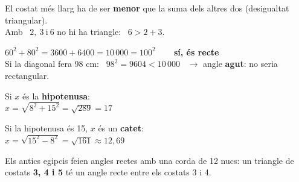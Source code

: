 \documentclass[11pt,a4paper]{article}
\newcommand{\heavy}{\fontseries{eb}\selectfont}
\newcommand{\be}[1]{{\color{fmok}\faCheckCircle}\ \ensuremath{#1}}
\newcommand{\mal}[1]{{\color{fmR}\faTimesCircle}\ {\color{fmR}\ensuremath{#1}}}
\begin{document}
\vfill
\begin{compte}
El costat més llarg ha de ser \textbf{menor} que la suma dels altres dos (desigualtat triangular).\\[3pt] Amb \mal{2,\ 3\ \text{i}\ 6} no hi ha triangle: \ $6>2+3$.
\end{compte}

\vfill
\begin{exemple}
\begin{minipage}[c]{0.6\linewidth}
$60^2+80^2=3600+6400=10\,000=100^2$ \ \be{} \ \textbf{sí, és recte}\\[4pt]
Si la diagonal fera 98 cm: \ $98^2=9604<10\,000$ \ $\to$ angle \textbf{agut}: no seria rectangular.
\end{minipage}\hfill
\begin{minipage}[c]{0.36\linewidth}\centering
{}
\end{minipage}
\end{exemple}

\vfill
\begin{exemple}
\begin{minipage}[t]{0.5\linewidth}
Si $x$ és la \textbf{hipotenusa}:\\[2pt]
$x=\sqrt{8^2+15^2}=\sqrt{289}=\boxed{17}$
\end{minipage}\hfill
\begin{minipage}[t]{0.47\linewidth}
Si la hipotenusa és 15, $x$ és un \textbf{catet}:\\[2pt]
$x=\sqrt{15^2-8^2}=\sqrt{161}\approx\boxed{12{,}69}$
\end{minipage}
\end{exemple}

\vfill
\begin{truc}
Els antics egipcis feien angles rectes amb una corda de 12 nucs: un triangle de costats \textbf{3, 4 i 5} té un angle recte entre els costats 3 i 4.
\end{truc}
\end{document}
